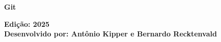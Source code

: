 \begin{titlepage}
\setmainfont{Arial}
\ColocarImagemCapa


    \begin{center}
        \begin{minipage}[c]{0.62\textwidth}
        \centering
            \vspace{275pt}
            \begin{huge}
            
            \textbf{Git} \\
            \end{huge}
            \textbf{Edição: 2025} \\
            \textbf{Desenvolvido por: Antônio Kipper e Bernardo Recktenvald}
            \vfill
        \end{minipage}
    \end{center}

    \newpage
    \ColocarImagemSumario
    \tableofcontents  %
    \ColocarImagemSumario
    \thispagestyle{empty} %
    \newpage

\end{titlepage}